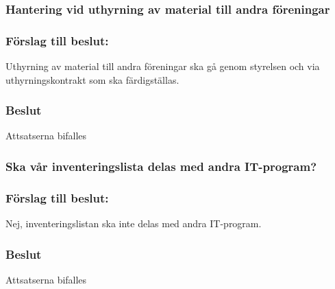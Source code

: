 \documentclass[protokoll]{dvd}
\begin{document}
\subsubsection*{Hantering vid uthyrning av material till andra föreningar}

\subsubsection*{Förslag till beslut:}
\begin{attsatser}
    \item Uthyrning av material till andra föreningar ska gå genom styrelsen och via uthyrningskontrakt som ska färdigställas.
\end{attsatser}

\subsubsection*{Beslut}
\begin{attsatser}
    \item Attsatserna bifalles
\end{attsatser}

\subsubsection*{Ska vår inventeringslista delas med andra IT-program?}

\subsubsection*{Förslag till beslut:}
\begin{attsatser}
    \item Nej, inventeringslistan ska inte delas med andra IT-program.
\end{attsatser}

\subsubsection*{Beslut}
\begin{attsatser}
    \item Attsatserna bifalles
\end{attsatser}
\end{document}
